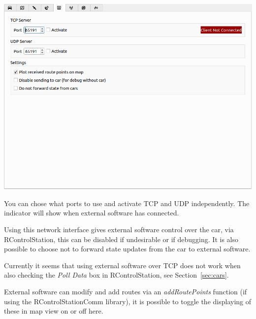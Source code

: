 \documentclass[12pt]{article} %
\begin{document}
\noindent\begin{minipage}{0.5\textwidth}
\noindent \includegraphics[width=\textwidth]{./screens/network_interface.png}
\end{minipage}
\begin{minipage}{0.5\textwidth}

You can chose what ports to use and activate TCP and UDP
independently. The indicator will show when external software has
connected.

Using this network interface gives external software control over the
car, via RControlStation, this can be disabled if undesirable or if
debugging. It is also possible to choose not to forward state updates
from the car to external software.

Currently it seems that using external software over TCP does not work
when also checking the {\em Poll Data} box in RControlStation, see
Section~\ref{sec:cars}.
\end{minipage}
External software can modify and add routes via an {\em
  addRoutePoints} function (if using the RControlStationComm library),
it is possible to toggle the displaying of these in map view on or off
here.
\end{document}
